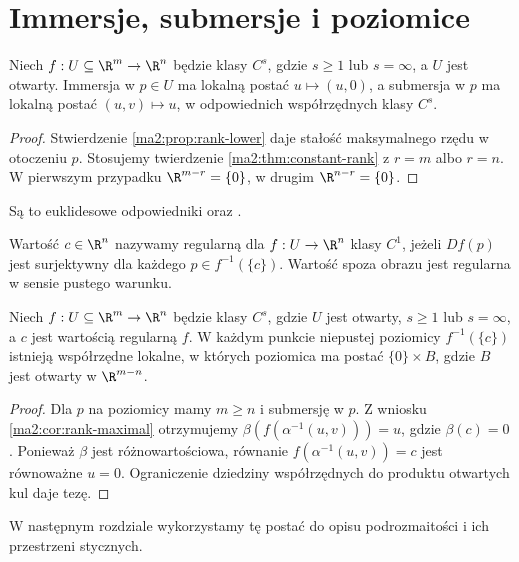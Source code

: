 \section{Immersje, submersje i poziomice}

\begin{wniosek}
\label{ma2:cor:rank-maximal}
Niech $f:U\subseteq\R^m\to\R^n$ będzie klasy
$C^s$, gdzie $s\ge1$ lub $s=\infty$, a $U$ jest
otwarty. Immersja w $p\in U$ ma lokalną postać $u\mapsto(u,0)$,
a submersja w $p$ ma lokalną postać $(u,v)\mapsto u$,
w odpowiednich współrzędnych klasy $C^s$.
\end{wniosek}
\begin{proof}
Stwierdzenie \ref{ma2:prop:rank-lower} daje stałość
maksymalnego rzędu w otoczeniu $p$.
Stosujemy twierdzenie \ref{ma2:thm:constant-rank}
z $r=m$ albo $r=n$. W pierwszym przypadku
$\R^{m-r}=\{0\}$, w drugim $\R^{n-r}=\{0\}$.
\end{proof}

Są to euklidesowe odpowiedniki
oraz
.

\begin{definicja}
\label{ma2:def:regular-value}
Wartość $c\in\R^n$ nazywamy regularną dla
$f:U\to\R^n$ klasy $C^1$, jeżeli $Df(p)$ jest
surjektywny dla każdego $p\in f^{-1}(\{c\})$.
Wartość spoza obrazu jest regularna w sensie
pustego warunku.
\end{definicja}

\begin{wniosek}
\label{ma2:cor:regular-fiber}
Niech $f:U\subseteq\R^m\to\R^n$ będzie klasy $C^s$,
gdzie $U$ jest otwarty, $s\ge1$ lub $s=\infty$,
a $c$ jest wartością regularną $f$. W każdym punkcie niepustej poziomicy
$f^{-1}(\{c\})$ istnieją współrzędne lokalne,
w których poziomica ma postać $\{0\}\times B$,
gdzie $B$ jest otwarty w $\R^{m-n}$.
\end{wniosek}
\begin{proof}
Dla $p$ na poziomicy mamy $m\ge n$ i submersję
w $p$. Z wniosku \ref{ma2:cor:rank-maximal} otrzymujemy
$\beta(f(\alpha^{-1}(u,v)))=u$, gdzie $\beta(c)=0$.
Ponieważ $\beta$ jest różnowartościowa, równanie
$f(\alpha^{-1}(u,v))=c$ jest równoważne $u=0$.
Ograniczenie dziedziny współrzędnych do produktu
otwartych kul daje tezę.
\end{proof}

W następnym rozdziale wykorzystamy tę postać do
opisu podrozmaitości i ich przestrzeni stycznych.

